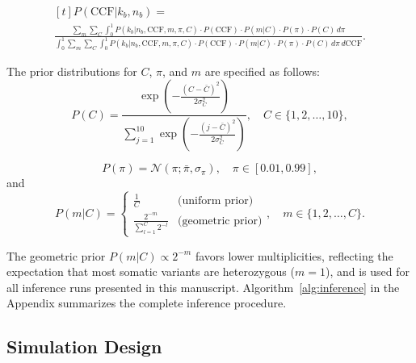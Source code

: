 \documentclass[10pt]{article}
\begin{document}
\begin{equation}
\begin{gathered}[t]
    P(\text{CCF} | k_b, n_b) = \\
    \frac{
        \sum_m{
            \sum_C{
                \int_{0}^{1}{
                    P(k_b | n_b, \text{CCF}, m, \pi, C) \cdot P(\text{CCF}) \cdot P(m|C) \cdot P(\pi) \cdot P(C) \, d\pi
                }
            }
        }
    }{
        \int_{0}^{1}{
            \sum_m{
                \sum_C{
                    \int_{0}^{1}{
                        P(k_b | n_b, \text{CCF}, m, \pi, C) \cdot P(\text{CCF}) \cdot P(m|C) \cdot P(\pi) \cdot P(C) \, d\pi \,d\text{CCF}
                    }
                }
            }
        }
    }
    .
\end{gathered}
\label{eq:ccf-posterior}
\end{equation}

The prior distributions for $C$, $\pi$, and $m$ are specified as follows:
\begin{equation}
    P(C) = \frac{
        \exp\left(-\frac{(C - \bar{C})^2}{2\sigma_C^2}\right)
    }{
    \sum_{j=1}^{10}{\exp\left(-\frac{(j - \bar{C})^2}{2\sigma_C^2}\right)}
    }, \quad C \in \{1, 2, \ldots, 10\}
    ,
\end{equation}

\begin{equation}
    P(\pi) = \mathcal{N}(\pi; \bar{\pi}, \sigma_{\pi}), \quad \pi \in [0.01, 0.99]
    ,
\end{equation}
and
\begin{equation}
    P(m | C) = \begin{cases}
        \frac{1}{C} & \text{(uniform prior)} \\
        \frac{2^{-m}}{\sum_{l=1}^{C} 2^{-l}} & \text{(geometric prior)}
    \end{cases}, \quad m \in \{1, 2, \ldots, C\}
    .
\end{equation}

The geometric prior $P(m|C) \propto 2^{-m}$ favors lower multiplicities, reflecting the expectation that most somatic variants are heterozygous ($m=1$), and is used for all inference runs presented in this manuscript.
Algorithm~\ref{alg:inference} in the Appendix summarizes the complete inference procedure.

\subsection{Simulation Design}
\end{document}
